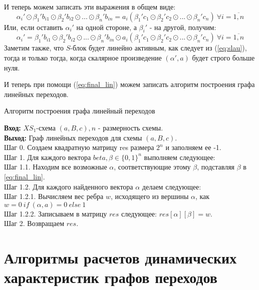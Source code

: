 \documentclass[a4paper,12pt]{extarticle}
\theoremstyle{plain} %
\begin{document}
\begin{large}
И теперь можем записать эти выражения в общем виде:
\begin{equation}\label{eq:slau}\alpha_i' \odot \beta_1'b_{i1} \odot \beta_2'b_{i2} \odot ... \odot \beta_n'b_{in} = a_i(\beta_1'c_1 \odot \beta_2'c_2 \odot ... \odot \beta_n'c_n) ~ \forall i=\overline{1,n} \end{equation}
Или, если оставить $\alpha_i'$ на одной стороне, а $\beta_i'$ - на другой, получим:
\begin{equation}\label{eq:final_lin}\alpha_i' = \beta_1'b_{i1} \odot \beta_2'b_{i2} \odot ... \odot \beta_n'b_{in} \odot a_i(\beta_1'c_1 \odot \beta_2'c_2 \odot ... \odot \beta_n'c_n) ~ \forall i=\overline{1,n} \end{equation}
Заметим также, что $S$-блок будет линейно активным, как следует из (\ref{eq:slau}), тогда и только тогда, когда скалярное произведение $(\alpha', a)$ будет строго больше нуля.

И теперь при помощи (\ref{eq:final_lin}) можем записать алгоритм построения графа линейных переходов.

\begin{algorithm}[H]
\caption{Алгоритм построения графа линейный переходов}
\label{diff_graph_construct}
\textbf{Вход:} $XS_1$-схема $(a, B, c), n$ - размерность схемы.\\
\textbf{Выход:} Граф линейных переходов для схемы $(a, B, c)$.\\
Шаг 0. Создаем квадратную матрицу res размера $2^n$ и заполняем ее -1. \\
Шаг 1. Для каждого вектора $beta, \beta \in \{0, 1\}^n$ выполняем следующее: \\
Шаг 1.1. Находим все возможные $\alpha$, соответствующие этому $\beta$, подставляя $\beta$ в \ref{eq:final_lin}.\\
Шаг 1.2. Для каждого найденного вектора $\alpha$ делаем следующее:\\
Шаг 1.2.1. Вычисляем вес ребра $w$, исходящего из вершины $\alpha$, как $w = 0~ if~ (\alpha, a) = 0~ else~1$ \\
Шаг 1.2.2. Записываем в матрицу $res$ следующее: $res[\alpha][\beta] = w$.\\
Шаг 2. Возвращаем $res$.\\
\end{algorithm} 

\newpage
\section{Алгоритмы расчетов динамических характеристик графов переходов}


\end{large}
\end{document}
